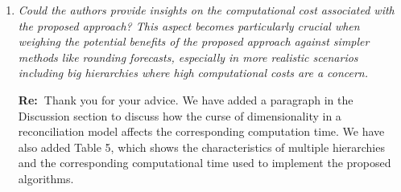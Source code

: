 \documentclass[11pt,a4paper]{article}
\newcommand{\RE}[2][Re:~]{{\color{blue}\textbf{#1}#2}}
\begin{document}
\begin{enumerate}
  \item \textit{Could the authors provide insights on the computational cost associated with the proposed approach? This aspect becomes particularly crucial when weighing the potential benefits of the proposed approach against simpler methods like rounding forecasts, especially in more realistic scenarios including big hierarchies where high computational costs are a concern.}
  
  \RE{Thank you for your advice. We have added a paragraph in the Discussion section to discuss how the curse of dimensionality in a reconciliation model affects the corresponding computation time. We have also added Table 5, which shows the characteristics of multiple hierarchies and the corresponding computational time used to implement the proposed algorithms.}


\end{enumerate}

% 
% 
\printbibliography
\end{document}
